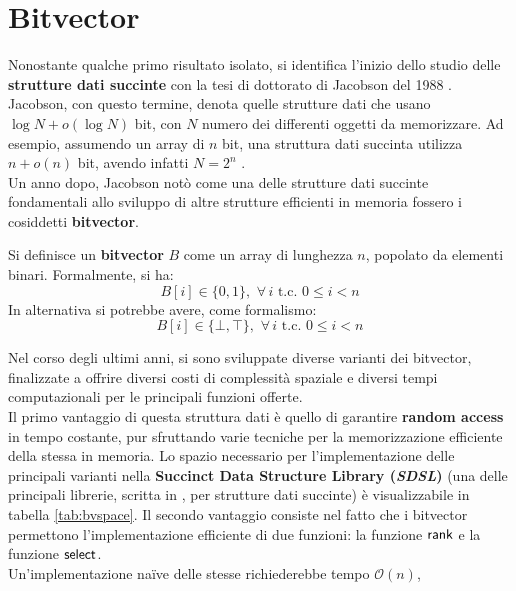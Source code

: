 \section{Bitvector}
\label{bvsec}
Nonostante qualche primo risultato isolato, si identifica l'inizio dello studio
delle \textbf{strutture dati succinte} con la tesi di 
dottorato di Jacobson 
del 1988 \cite{succinct}.
Jacobson, con questo termine, denota quelle strutture dati che
usano $\log N+o(\log N)$
bit, con $N$ numero dei differenti oggetti da memorizzare.
Ad esempio, assumendo un array di $n$ bit, una struttura dati succinta
utilizza $n+o(n)$ bit, avendo infatti $N=2^n$ \cite{navarro}.\\
Un anno dopo, Jacobson \cite{jacobson} notò come una delle strutture
  dati succinte fondamentali allo sviluppo di altre strutture efficienti in
memoria fossero i cosiddetti \textbf{bitvector}.
\begin{definizione}
  Si definisce un \textbf{bitvector} $B$ come un array di lunghezza $n$,
  popolato da elementi binari. Formalmente, si ha:
  \begin{equation}
    \label{eq:bvdef1}
    B[i]\in\{0,1\},\,\,\forall\, i \mbox{ t.c. } 0\leq i < n
  \end{equation}
  In alternativa si potrebbe avere, come formalismo:
  \begin{equation}
    \label{eq:bvdef2}
    B[i]\in\{\bot,\top\},\,\,\forall\, i \mbox{ t.c. } 0\leq i < n
  \end{equation}
\end{definizione}
Nel corso degli ultimi anni, si sono sviluppate diverse varianti dei
bitvector, finalizzate a offrire diversi costi di complessità spaziale
e 
diversi tempi computazionali per le principali funzioni offerte.\\
Il primo vantaggio di questa struttura dati è quello di garantire \textbf{random
  access} in tempo costante, pur 
sfruttando varie tecniche per la memorizzazione efficiente della stessa in
memoria. Lo spazio necessario per l'implementazione delle principali varianti
nella \textbf{Succinct Data Structure Library (\textit{SDSL})} 
\cite{sdsl} (una delle principali librerie, scritta in , per
strutture dati succinte) è visualizzabile in tabella 
\ref{tab:bvspace}. Il secondo vantaggio consiste nel fatto che i
bitvector permettono l'implementazione efficiente di due funzioni: la funzione
$\mbox{\rm {\sf rank}}$ e la funzione $\mbox{\rm {\sf select}}$.\\
Un'implementazione na\"{i}ve delle stesse richiederebbe tempo $\mathcal{O}(n)$,
